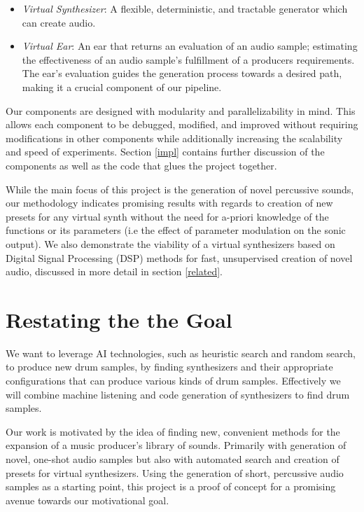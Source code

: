 \documentclass[\main/thesis.tex]{subfiles}
\begin{document}
\begin{itemize}
    \item \textit{Virtual Synthesizer}: A flexible, deter\-min\-istic, and tract\-able gener\-ator which can create audio. 
    \item \textit{Virtual Ear}: An ear that returns an evaluation of an audio sample; estimating the effectiveness of an audio sample's fulfillment of a producers requirements. The ear's evaluation guides the generation process towards a desired path, making it a crucial component of our pipeline. 
\end{itemize}
Our components are designed with modularity and parallelizability in mind. This allows each component to be debugged, modified, and improved without requiring modifications in other components while additionally increasing the scalability and speed of experiments. 
Section \ref{impl} contains further discussion of the components as well as the code that glues the project together.

While the main focus of this project is the generation of novel percussive sounds, our methodology indicates promising results with regards to creation of new presets for any virtual synth without the need for a-priori knowledge of the functions or its parameters (i.e the effect of parameter modulation on the sonic output). We also demonstrate the viability of a virtual synthesizers based on Digital Signal Processing (DSP) methods for fast, unsupervised creation of novel audio, discussed in more detail in section \ref{related}. 


\section{Restating the the Goal}
We want to leverage AI technologies, such as heuristic search and random search, to produce new drum samples, by finding synthesizers and their appropriate configurations that can produce various kinds of drum samples. Effectively we will combine machine listening and code generation of synthesizers to find drum samples.

Our work is motivated by the idea of finding new, convenient methods for the expansion of a music producer's library of sounds. Primarily with generation of novel, one-shot audio samples but also with automated search and creation of presets for virtual synthesizers. Using the generation of short, percussive audio samples as a starting point, this project is a proof of concept for a promising avenue towards our motivational goal.
\end{document}
